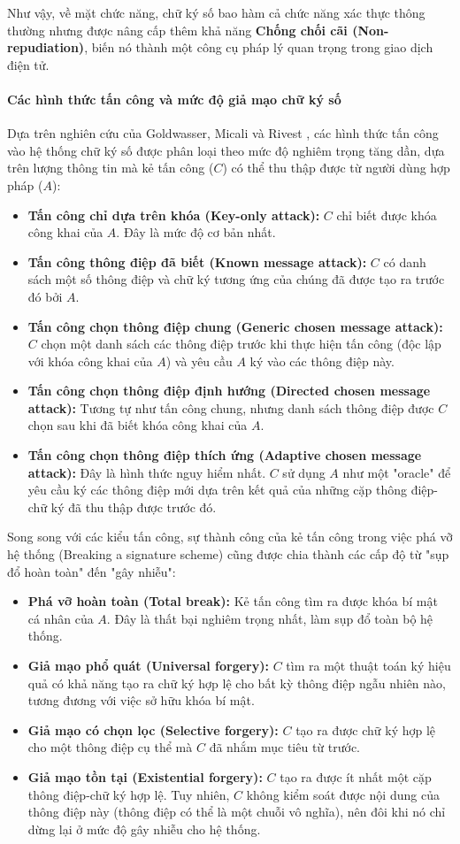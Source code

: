 Như vậy, về mặt chức năng, chữ ký số bao hàm cả chức năng xác thực thông thường nhưng được nâng cấp thêm khả năng \textbf{Chống chối cãi (Non-repudiation)}, biến nó thành một công cụ pháp lý quan trọng trong giao dịch điện tử.
\paragraph*{Các hình thức tấn công và mức độ giả mạo chữ ký số}
Dựa trên nghiên cứu của Goldwasser, Micali và Rivest \cite{GOLD88}, các hình thức tấn công vào hệ thống chữ ký số được phân loại theo mức độ nghiêm trọng tăng dần, dựa trên lượng thông tin mà kẻ tấn công ($C$) có thể thu thập được từ người dùng hợp pháp ($A$):
\begin{itemize}
    \item \textbf{Tấn công chỉ dựa trên khóa (Key-only attack):} $C$ chỉ biết được khóa công khai của $A$. Đây là mức độ cơ bản nhất.
    \item \textbf{Tấn công thông điệp đã biết (Known message attack):} $C$ có danh sách một số thông điệp và chữ ký tương ứng của chúng đã được tạo ra trước đó bởi $A$.
    \item \textbf{Tấn công chọn thông điệp chung (Generic chosen message attack):} $C$ chọn một danh sách các thông điệp trước khi thực hiện tấn công (độc lập với khóa công khai của $A$) và yêu cầu $A$ ký vào các thông điệp này.
    \item \textbf{Tấn công chọn thông điệp định hướng (Directed chosen message attack):} Tương tự như tấn công chung, nhưng danh sách thông điệp được $C$ chọn sau khi đã biết khóa công khai của $A$.
    \item \textbf{Tấn công chọn thông điệp thích ứng (Adaptive chosen message attack):} Đây là hình thức nguy hiểm nhất. $C$ sử dụng $A$ như một "oracle" để yêu cầu ký các thông điệp mới dựa trên kết quả của những cặp thông điệp-chữ ký đã thu thập được trước đó.
\end{itemize}

Song song với các kiểu tấn công, sự thành công của kẻ tấn công trong việc phá vỡ hệ thống (Breaking a signature scheme) cũng được chia thành các cấp độ từ "sụp đổ hoàn toàn" đến "gây nhiễu":

\begin{itemize}
    \item \textbf{Phá vỡ hoàn toàn (Total break):} Kẻ tấn công tìm ra được khóa bí mật cá nhân của $A$. Đây là thất bại nghiêm trọng nhất, làm sụp đổ toàn bộ hệ thống.
    \item \textbf{Giả mạo phổ quát (Universal forgery):} $C$ tìm ra một thuật toán ký hiệu quả có khả năng tạo ra chữ ký hợp lệ cho bất kỳ thông điệp ngẫu nhiên nào, tương đương với việc sở hữu khóa bí mật.
    \item \textbf{Giả mạo có chọn lọc (Selective forgery):} $C$ tạo ra được chữ ký hợp lệ cho một thông điệp cụ thể mà $C$ đã nhắm mục tiêu từ trước.
    \item \textbf{Giả mạo tồn tại (Existential forgery):} $C$ tạo ra được ít nhất một cặp thông điệp-chữ ký hợp lệ. Tuy nhiên, $C$ không kiểm soát được nội dung của thông điệp này (thông điệp có thể là một chuỗi vô nghĩa), nên đôi khi nó chỉ dừng lại ở mức độ gây nhiễu cho hệ thống.
\end{itemize}
